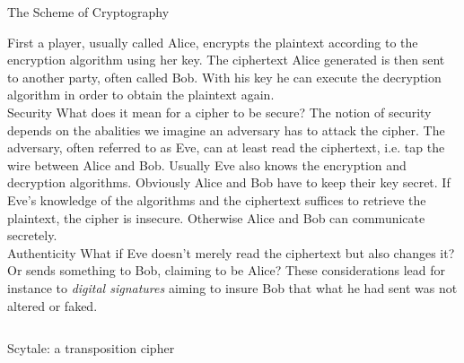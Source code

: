 \documentclass[final,hyperref={pdfpagelabels=false}]{beamer}
\newcommand{\gearmacro}[5]{%
    \foreach \i in {1,...,#1} {%
      [rotate=(\i-1)*360/#1]  (0:#2)  arc (0:#4:#2) {[rounded corners=1.5pt]
        -- (#4+#5:#3)  arc (#4+#5:360/#1-#5:#3)} --  (360/#1:#2)
    }}
\begin{document}
\begin{frame}{}
\begin{columns}[t]
\begin{column}{.63\linewidth}
\begin{alertblock}{The Scheme of Cryptography}
\begin{figure}
    \end{figure}
    First a player, usually called Alice, encrypts the plaintext according to the encryption algorithm using her key. The ciphertext Alice generated is then sent to another party, often called Bob. With his key he can execute the decryption algorithm in order to obtain the plaintext again. \\
    \alert{Security} 
      What does it mean for a cipher to be secure? The notion of security depends on the abalities we imagine an adversary has to attack the cipher. The adversary, often referred to as Eve, can at least read the ciphertext, i.e. tap the wire between Alice and Bob. Usually Eve also knows the encryption and decryption algorithms. Obviously Alice and Bob have to keep their key secret. If Eve's knowledge of the algorithms and the ciphertext suffices to retrieve the plaintext, the cipher is insecure. Otherwise Alice and Bob can communicate secretely. \\
    \alert{Authenticity} 
      What if Eve doesn't merely read the ciphertext but also changes it? Or sends something to Bob, claiming to be Alice? These considerations lead for instance to {\em digital signatures} aiming to insure Bob that what he had sent was not altered or faked.
    \end{alertblock}
    \end{column}
    \end{columns}
    \begin{columns}[t]
    \begin{column}{.3\linewidth}
        \begin{block}{Scytale: a transposition cipher}

\end{block}
\end{column}
\end{columns}
\end{frame}
\end{document}
